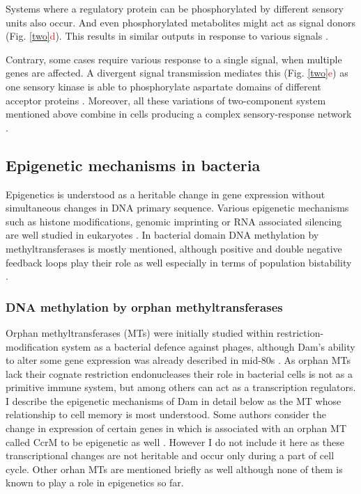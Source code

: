 Systems where a regulatory protein can be phosphorylated by different sensory units also occur.
And even phosphorylated metabolites might act as signal donors (Fig. \ref{two}\textcolor{red}{d}).
This results in similar outputs in response to various signals \cite{kaczmarczyk2014complex, chambonnier2016hybrid}.

Contrary, some cases require various response to a single signal, when multiple genes are affected.
A divergent signal transmission mediates this (Fig. \ref{two}\textcolor{red}{e}) as one sensory kinase is able to phosphorylate aspartate domains of different acceptor proteins \cite{mika2005two, groisman2016feedback}.
Moreover, all these variations of two-component system mentioned above combine in cells producing a complex sensory-response network \cite{kaczmarczyk2014complex, chambonnier2016hybrid}.

\subsection{Epigenetic mechanisms in bacteria}
Epigenetics is understood as a heritable change in gene expression without simultaneous changes in DNA primary sequence.
Various epigenetic mechanisms such as histone modifications, genomic imprinting or RNA associated silencing are well studied in eukaryotes \cite{durso2014mechanisms}.
In bacterial domain DNA methylation by methyltransferases is mostly mentioned, although positive and double negative feedback loops play their role as well especially in terms of population bistability \cite{casadesus2006epigenetic, casadesus2013programmed, adhikari2016dna}.

\subsubsection{DNA methylation by orphan methyltransferases}
Orphan methyltransferases (MTs) were initially studied within restriction-modification system as a bacterial defence against phages, although Dam's ability to alter some gene expression was already described in mid-80s \cite{sternberg1985evidence, bickle1993biology}.
As orphan MTs lack their cognate restriction endonucleases their role in bacterial cells is not as a primitive immune system, but among others can act as a transcription regulators.
I describe the epigenetic mechanisms of Dam in detail below as the MT whose relationship to cell memory is most understood.
Some authors consider the change in expression of certain genes in  which is associated with an orphan MT called CcrM to be epigenetic as well \cite{casadesus2006epigenetic, adhikari2016dna}.
However I do not include it here as these transcriptional changes are not heritable and occur only during a part of cell cycle.
Other  orhan MTs are mentioned briefly as well although none of them is known to play a role in epigenetics so far.

